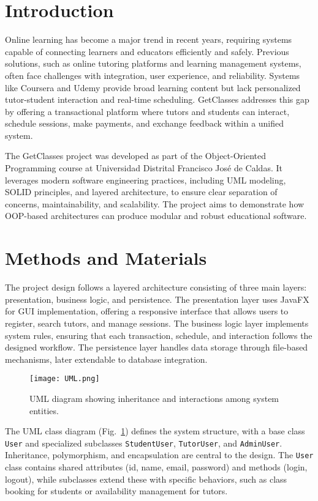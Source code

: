 \documentclass[conference]{IEEEtran}
\begin{document}
\section{Introduction}
Online learning has become a major trend in recent years, requiring systems capable of connecting learners and educators efficiently and safely. Previous solutions, such as online tutoring platforms and learning management systems, often face challenges with integration, user experience, and reliability. Systems like Coursera and Udemy provide broad learning content but lack personalized tutor-student interaction and real-time scheduling. GetClasses addresses this gap by offering a transactional platform where tutors and students can interact, schedule sessions, make payments, and exchange feedback within a unified system.

The GetClasses project was developed as part of the Object-Oriented Programming course at Universidad Distrital Francisco Jos\'e de Caldas. It leverages modern software engineering practices, including UML modeling, SOLID principles, and layered architecture, to ensure clear separation of concerns, maintainability, and scalability. The project aims to demonstrate how OOP-based architectures can produce modular and robust educational software.

\section{Methods and Materials}
The project design follows a layered architecture consisting of three main layers: presentation, business logic, and persistence. The presentation layer uses JavaFX for GUI implementation, offering a responsive interface that allows users to register, search tutors, and manage sessions. The business logic layer implements system rules, ensuring that each transaction, schedule, and interaction follows the designed workflow. The persistence layer handles data storage through file-based mechanisms, later extendable to database integration.

\begin{figure}[H]
    \centering
    \texttt{[image: UML.png]}
    \caption{UML diagram showing inheritance and interactions among system entities.}
    \label{fig:uml}
\end{figure}

The UML class diagram (Fig.~\ref{fig:uml}) defines the system structure, with a base class \texttt{User} and specialized subclasses \texttt{StudentUser}, \texttt{TutorUser}, and \texttt{AdminUser}. Inheritance, polymorphism, and encapsulation are central to the design. The \texttt{User} class contains shared attributes (id, name, email, password) and methods (login, logout), while subclasses extend these with specific behaviors, such as class booking for students or availability management for tutors.
\end{document}
